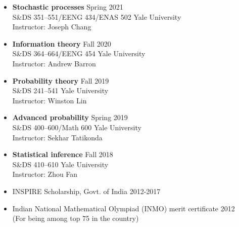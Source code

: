 \documentclass[letterpaper,11pt,oneside]{article}
\theoremstyle{definition}
\begin{document}
	\begin{itemize}
		\item[] {\bf Stochastic processes} \hfill Spring 2021\\
		S\&DS 351--551/EENG 434/ENAS 502 \hfill Yale University\\
		Instructor: Joseph Chang
		
		\item[] {\bf Information theory} \hfill Fall 2020\\
		S\&DS 364--664/EENG 454 \hfill Yale University\\
		Instructor: Andrew Barron
		\item[] {\bf Probability theory} \hfill Fall 2019\\
		 S\&DS 241--541  \hfill Yale University\\
		 Instructor: Winston Lin
		\item[] {\bf Advanced probability} \hfill Spring 2019\\
		S\&DS 400--600/Math 600  \hfill Yale University\\
		Instructor: Sekhar Tatikonda
		\item[] {\bf Statistical inference} \hfill Fall 2018\\
		 S\&DS 410--610  \hfill Yale University\\
		 Instructor: Zhou Fan
		 
	\end{itemize}	

	\begin{itemize}
		\item [] INSPIRE Scholarship, Govt. of India \hfill 2012-2017
		\item [] Indian National Mathematical Olympiad (INMO) merit certificate \hfill 2012\\
		(For being among top 75 in the country)
	\end{itemize}
\end{document}
